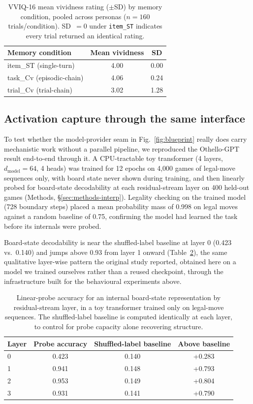 \documentclass[pdflatex,sn-nature]{sn-jnl}
\begin{document}
\begin{table}[h]
\centering
\caption{VVIQ-16 mean vividness rating ($\pm$SD) by memory condition,
pooled across personas ($n=160$ trials/condition). SD~$=0$ under
\texttt{item\_ST} indicates every trial returned an identical rating.}
\label{tab:vviq}
\begin{tabular}{@{}lcc@{}}
\toprule
Memory condition & Mean vividness & SD \\
\midrule
item\_ST (single-turn) & 4.00 & 0.00 \\
task\_Cv (episodic-chain) & 4.06 & 0.24 \\
trial\_Cv (trial-chain) & 3.02 & 1.28 \\
\bottomrule
\end{tabular}
\end{table}

\subsection{Activation capture through the same
interface}\label{sec:results-interp}

To test whether the model-provider seam in Fig.~\ref{fig:blueprint} really
does carry mechanistic work without a parallel pipeline, we reproduced the
Othello-GPT result \citep{li2023othello} end-to-end through it. A
CPU-tractable toy transformer (4 layers, $d_{\text{model}}=64$, 4 heads)
was trained for 12 epochs on 4,000 games of legal-move sequences only, with
board state never shown during training, and then linearly probed for
board-state decodability at each residual-stream layer on 400 held-out
games (Methods, \S\ref{sec:methods-interp}). Legality checking on the
trained model (728 boundary steps) placed a mean probability mass of 0.998
on legal moves against a random baseline of 0.75, confirming the model had
learned the task before its internals were probed.

Board-state decodability is near the shuffled-label baseline at layer 0
(0.423 vs.\ 0.140) and jumps above 0.93 from layer 1 onward
(Table~\ref{tab:othello}), the same qualitative layer-wise pattern the
original study reported, obtained here on a model we trained ourselves
rather than a reused checkpoint, through the infrastructure built for the
behavioural experiments above.

\begin{table}[h]
\centering
\caption{Linear-probe accuracy for an internal board-state representation
by residual-stream layer, in a toy transformer trained only on legal-move
sequences. The shuffled-label baseline is computed identically at each
layer, to control for probe capacity alone recovering structure.}
\label{tab:othello}
\begin{tabular}{@{}lccc@{}}
\toprule
Layer & Probe accuracy & Shuffled-label baseline & Above baseline \\
\midrule
0 & 0.423 & 0.140 & +0.283 \\
1 & 0.941 & 0.148 & +0.793 \\
2 & 0.953 & 0.149 & +0.804 \\
3 & 0.931 & 0.141 & +0.790 \\
\bottomrule
\end{tabular}
\end{table}
\end{document}
